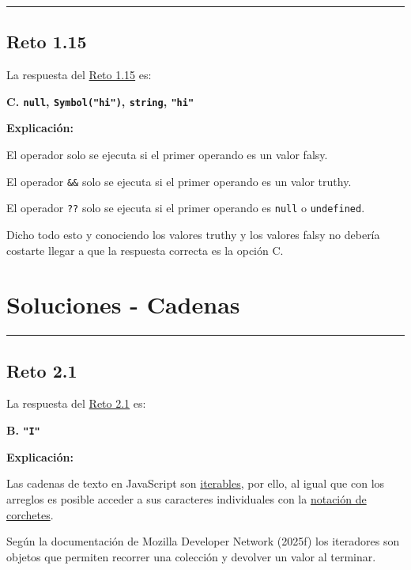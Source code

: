 \documentclass[
  letterpaper,
  DIV=11,
  numbers=noendperiod]{scrreprt}
\begin{document}
\begin{center}\rule{0.5\linewidth}{0.5pt}\end{center}

\section{Reto 1.15}\label{sec-sol-cap1-reto15}

La respuesta del \hyperref[sec-cap1-reto15]{Reto 1.15} es:

\textbf{C. \texttt{null}, \texttt{Symbol("hi")}, \texttt{string},
\texttt{"hi"}}

\textbf{Explicación:}

El operador \texttt{\textbar{}\textbar{}} solo se ejecuta si el primer
operando es un valor falsy.

El operador \texttt{\&\&} solo se ejecuta si el primer operando es un
valor truthy.

El operador \texttt{??} solo se ejecuta si el primer operando es
\texttt{null} o \texttt{undefined}.

Dicho todo esto y conociendo los valores truthy y los valores falsy no
debería costarte llegar a que la respuesta correcta es la opción C.

\chapter{Soluciones - Cadenas}\label{soluciones---cadenas}

\begin{center}\rule{0.5\linewidth}{0.5pt}\end{center}

\section{Reto 2.1}\label{sec-sol-cap2-reto1}

La respuesta del \hyperref[sec-cap2-reto1]{Reto 2.1} es:

\textbf{B. \texttt{"I"}}

\textbf{Explicación:}

Las cadenas de texto en JavaScript son
\hyperref[glos-iterable]{iterables}, por ello, al igual que con los
arreglos es posible acceder a sus caracteres individuales con la
\hyperref[glos-notacion_corchetes]{notación de corchetes}.

Según la documentación de Mozilla Developer Network (2025f) los
iteradores son objetos que permiten recorrer una colección y devolver un
valor al terminar.
\end{document}

